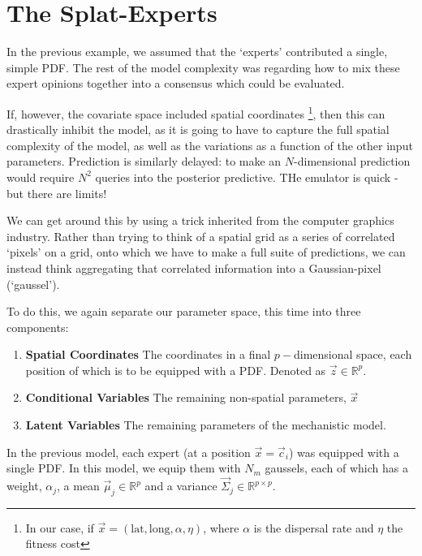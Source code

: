 \section{The Splat-Experts}

        In the previous example, we assumed that the `experts' contributed a single, simple PDF. The rest of the model complexity was regarding how to mix these expert opinions together into a consensus which could be evaluated. 

        If, however, the covariate space included spatial coordinates \footnote{In our case, if $\vec{x} = (\text{lat},\text{long}, \alpha,\eta)$, where $\alpha$ is the dispersal rate and $\eta$ the fitness cost}, then this can drastically inhibit the model, as it is going to have to capture the full spatial complexity of the model, as well as the variations as a function of the other input parameters. Prediction is similarly delayed: to make an $N$-dimensional prediction would require $N^2$ queries into the posterior predictive. THe emulator is quick - but there are limits!

        We can get around this by using a trick inherited from the computer graphics industry. Rather than trying to think of a spatial grid as a series of correlated `pixels' on a grid, onto which we have to make a full suite of predictions, we can instead think aggregating that correlated information into a Gaussian-pixel (`gaussel').

        To do this, we again separate our parameter space, this time into three components:
        \begin{enumerate}
            \item \textbf{Spatial Coordinates} The coordinates in a final $p-$dimensional space, each position of which is to be equipped with a PDF. Denoted as $\vec{z} \in \mathbb{R}^p$.
            \item \textbf{Conditional Variables} The remaining non-spatial parameters, $\vec{x}$
            \item \textbf{Latent Variables} The remaining parameters of the mechanistic model. 
        \end{enumerate}

        In the previous model, each expert (at a position $\vec{x} = \vec{c}_i$) was equipped with a single PDF. In this model, we equip them with $N_m$ gaussels, each of which has a weight, $\alpha_j$, a mean $\vec{\mu}_j \in \mathbb{R}^p$ and a variance $\vec{\Sigma}_j \in \mathbb{R}^{p\times p}$. 

